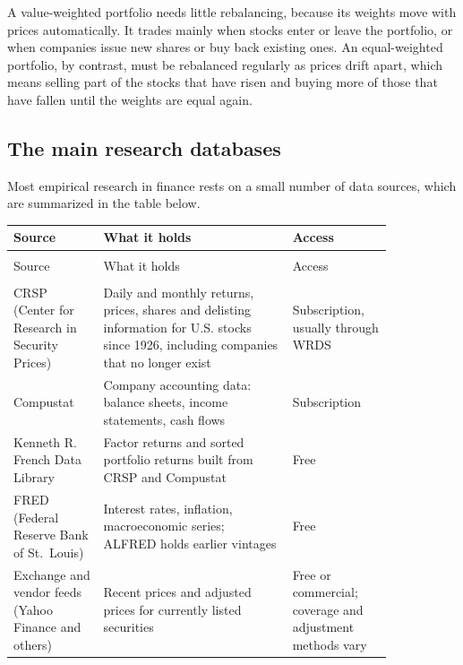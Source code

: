 A value-weighted portfolio needs little rebalancing, because its weights move with prices automatically. It trades mainly when stocks enter or leave the portfolio, or when companies issue new shares or buy back existing ones. An equal-weighted portfolio, by contrast, must be rebalanced regularly as prices drift apart, which means selling part of the stocks that have risen and buying more of those that have fallen until the weights are equal again.


\subsection{The main research databases}

Most empirical research in finance rests on a small number of data sources, which are summarized in the table below.

\begingroup
\small
\setlength{\LTpre}{6pt}\setlength{\LTpost}{6pt}
\begin{longtable}{@{}>{\raggedright\arraybackslash}p{0.2\linewidth}>{\raggedright\arraybackslash}p{0.42\linewidth}>{\raggedright\arraybackslash}p{0.22\linewidth}@{}}
\toprule
Source & What it holds & Access \\
\midrule
\endfirsthead
\multicolumn{3}{@{}l}{\emph{(continued)}}\\
\toprule
Source & What it holds & Access \\
\midrule
\endhead
\midrule
\multicolumn{3}{r@{}}{\emph{continued on next page}}\\
\endfoot
\bottomrule
\endlastfoot
CRSP (Center for Research in Security Prices) & Daily and monthly returns, prices, shares and delisting information for U.S. stocks since 1926, including companies that no longer exist & Subscription, usually through WRDS \\
Compustat & Company accounting data: balance sheets, income statements, cash flows & Subscription \\
Kenneth R. French Data Library & Factor returns and sorted portfolio returns built from CRSP and Compustat & Free \\
FRED (Federal Reserve Bank of St.\ Louis) & Interest rates, inflation, macroeconomic series; ALFRED holds earlier vintages & Free \\
Exchange and vendor feeds (Yahoo Finance and others) & Recent prices and adjusted prices for currently listed securities & Free or commercial; coverage and adjustment methods vary \\
\end{longtable}
\endgroup

